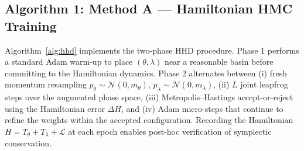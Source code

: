 \documentclass[11pt]{article}
\begin{document}
\subsection{Algorithm 1: Method A — Hamiltonian HMC Training}
Algorithm~\ref{alg:hhd} implements the two-phase HHD procedure.
Phase 1 performs a standard Adam warm-up to place $(\theta, \lambda)$
near a reasonable basin before committing to the Hamiltonian dynamics.
Phase 2 alternates between (i) fresh momentum resampling
$p_\theta \sim \mathcal{N}(0, m_\theta)$,
$p_\lambda \sim \mathcal{N}(0, m_\lambda)$,
(ii) $L$ joint leapfrog steps over the augmented phase space, (iii)
Metropolis--Hastings accept-or-reject using the Hamiltonian error
$\Delta H$, and (iv) Adam micro-steps that continue to refine the
weights within the accepted configuration.  Recording the
Hamiltonian $H = T_\theta + T_\lambda + \mathcal{L}$ at each epoch
enables post-hoc verification of symplectic conservation.
\end{document}
